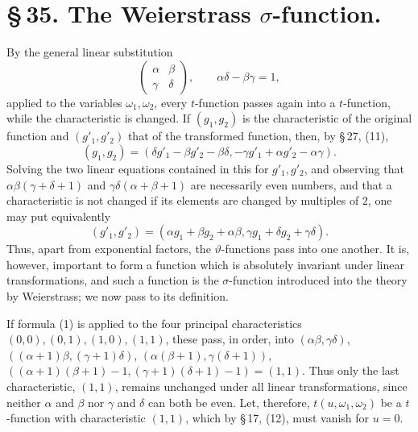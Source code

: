 \documentclass[11pt]{article}
\begin{document}
\section*{\S\,35. The Weierstrass $\sigma$-function.}

By the general linear substitution
\[
\begin{pmatrix}\alpha&\beta\\ \gamma&\delta\end{pmatrix},
\qquad \alpha\delta-\beta\gamma=1,
\]
applied to the variables $\omega_1,\omega_2$, every $t$-function passes again into a $t$-function, while the characteristic is changed. If $(g_1,g_2)$ is the characteristic of the original function and $(g'_1,g'_2)$ that of the transformed function, then, by \S\,27, (11),
\[
(g_1,g_2)=(\delta g'_1-\beta g'_2-\beta\delta,
-\gamma g'_1+\alpha g'_2-\alpha\gamma).
\]
Solving the two linear equations contained in this for $g'_1,g'_2$, and observing that $\alpha\beta(\gamma+\delta+1)$ and $\gamma\delta(\alpha+\beta+1)$ are necessarily even numbers, and that a characteristic is not changed if its elements are changed by multiples of $2$, one may put equivalently
\begin{equation}
(g'_1,g'_2)=(\alpha g_1+\beta g_2+\alpha\beta,
\gamma g_1+\delta g_2+\gamma\delta). \tag{1}
\end{equation}
Thus, apart from exponential factors, the $\vartheta$-functions pass into one another. It is, however, important to form a function which is absolutely invariant under linear transformations, and such a function is the $\sigma$-function introduced into the theory by Weierstrass; we now pass to its definition.

If formula (1) is applied to the four principal characteristics $(0,0),(0,1),(1,0),(1,1)$, these pass, in order, into $(\alpha\beta,\gamma\delta)$, $((\alpha+1)\beta,(\gamma+1)\delta)$, $(\alpha(\beta+1),\gamma(\delta+1))$, $((\alpha+1)(\beta+1)-1,(\gamma+1)(\delta+1)-1)=(1,1)$. Thus only the last characteristic, $(1,1)$, remains unchanged under all linear transformations, since neither $\alpha$ and $\beta$ nor $\gamma$ and $\delta$ can both be even. Let, therefore, $t(u,\omega_1,
\omega_2)$ be a $t$-function with characteristic $(1,1)$, which by \S\,17, (12), must vanish for $u=0$.
\end{document}
